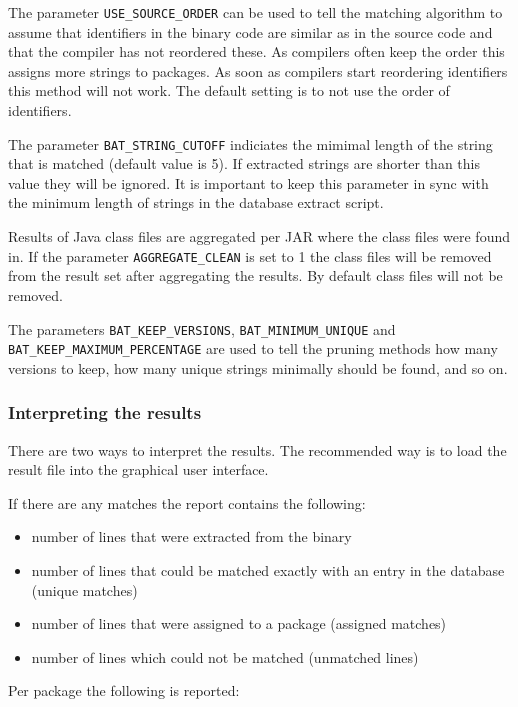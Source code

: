 \documentclass[10pt,a4paper]{article}
\begin{document}
The parameter \texttt{USE\_SOURCE\_ORDER} can be used to tell the matching
algorithm to assume that identifiers in the binary code are similar as in the
source code and that the compiler has not reordered these. As compilers often
keep the order this assigns more strings to packages. As soon as compilers
start reordering identifiers this method will not work. The default setting
is to not use the order of identifiers.

The parameter \texttt{BAT\_STRING\_CUTOFF} indiciates the mimimal length of the
string that is matched (default value is 5). If extracted strings are shorter
than this value they will be ignored. It is important to keep this parameter in
sync with the minimum length of strings in the database extract script.

Results of Java class files are aggregated per JAR where the class files were
found in. If the parameter \texttt{AGGREGATE\_CLEAN} is set to 1 the class
files will be removed from the result set after aggregating the results. By
default class files will not be removed.

The parameters \texttt{BAT\_KEEP\_VERSIONS}, \texttt{BAT\_MINIMUM\_UNIQUE} and
\texttt{BAT\_KEEP\_MAXIMUM\_PERCENTAGE} are used to tell the pruning methods
how many versions to keep, how many unique strings minimally should be found,
and so on.

\subsubsection{Interpreting the results}

There are two ways to interpret the results. The recommended way is to load the
result file into the graphical user interface.

If there are any matches the report contains the following:

\begin{itemize}
\item number of lines that were extracted from the binary
\item number of lines that could be matched exactly with an entry in the
database (unique matches)
\item number of lines that were assigned to a package (assigned matches)
\item number of lines which could not be matched (unmatched lines)
\end{itemize}

Per package the following is reported:
\end{document}
